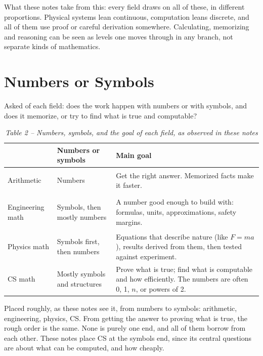 \documentclass[11pt,a4paper]{article}
\begin{document}
What these notes take from this: every field draws on all of these, in different proportions.
Physical systems lean continuous, computation leans discrete, and all of them use proof or
careful derivation somewhere. Calculating, memorizing and reasoning can be seen as levels
one moves through in any branch, not separate kinds of mathematics.

\newpage %
\section{Numbers or Symbols}

Asked of each field: does the work happen with numbers or with symbols, and does it
memorize, or try to find what is true and computable?

\begin{table}[H]
\centering
\caption*{\itshape Table 2 -- Numbers, symbols, and the goal of each field, as observed in these notes}
\small
\begin{tabularx}{\textwidth}{@{}>{\bfseries\raggedright}L{0.18\textwidth}L{0.25\textwidth}Y@{}}
\toprule
 & \textbf{Numbers or symbols} & \textbf{Main goal} \\
\midrule
Arithmetic & Numbers & Get the right answer. Memorized facts make it faster. \\[0.4em]
Engineering math & Symbols, then mostly numbers & A number good enough to build with: formulas, units, approximations, safety margins. \\[0.4em]
Physics math & Symbols first, then numbers & Equations that describe nature (like $F = ma$), results derived from them, then tested against experiment. \\[0.4em]
CS math & Mostly symbols and structures & Prove what is true; find what is computable and how efficiently. The numbers are often 0, 1, $n$, or powers of 2. \\
\bottomrule
\end{tabularx}
\end{table}

Placed roughly, as these notes see it, from numbers to symbols: arithmetic, engineering,
physics, CS. From getting the answer to proving what is true, the rough order is the same.
None is purely one end, and all of them borrow from each other. These notes place CS at the
symbols end, since its central questions are about what can be computed, and how cheaply.
\end{document}
